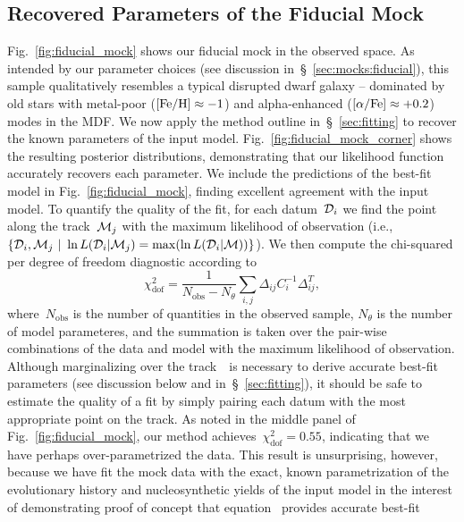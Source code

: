 \documentclass[ms.tex]{subfiles}
\begin{document}
\subsection{Recovered Parameters of the Fiducial Mock}
\label{sec:mocks:recovered}

Fig.~\ref{fig:fiducial_mock} shows our fiducial mock in the observed space.
As intended by our parameter choices (see discussion
in~\S~\ref{sec:mocks:fiducial}), this sample qualitatively resembles a typical
disrupted dwarf galaxy -- dominated by old stars with metal-poor
($\text{[Fe/H]} \approx -1$) and alpha-enhanced ($\text{[$\alpha$/Fe]} \approx +0.2$) modes in the MDF.
We now apply the method outline in~\S~\ref{sec:fitting} to recover the known
parameters of the input model.
Fig.~\ref{fig:fiducial_mock_corner} shows the resulting posterior distributions,
demonstrating that our likelihood function accurately recovers each parameter.
We include the predictions of the best-fit model in Fig.~\ref{fig:fiducial_mock},
finding excellent agreement with the input model.
To quantify the quality of the fit, for each datum~$\mathcal{D}_i$ we find the
point along the track~$\mathcal{M}_j$ with the maximum likelihood of observation
(i.e.,~$\{\mathcal{D}_i,\mathcal{M}_j~|~\ln L(\mathcal{D}_i | \mathcal{M}_j) =
\max(\ln L(\mathcal{D}_i | \mathcal{M}))\}$).
We then compute the chi-squared per degree of freedom diagnostic according to
\begin{equation}
\chi_\text{dof}^2 = \frac{1}{N_\text{obs} - N_\theta}
\sum_{i,j} \Delta_{ij} C_i^{-1} \Delta_{ij}^T,
\label{eq:chisquared_dof}
\end{equation}
where~$N_\text{obs}$ is the number of quantities in the observed sample,
$N_\theta$ is the number of model parameteres, and the summation is taken over
the pair-wise combinations of the data and model with the maximum likelihood of
observation.
Although marginalizing over the track~~is necessary to derive
accurate best-fit parameters (see discussion below and in~\S~\ref{sec:fitting}),
it should be safe to estimate the quality of a fit by simply pairing each datum
with the most appropriate point on the track.
As noted in the middle panel of Fig.~\ref{fig:fiducial_mock}, our method
achieves~$\chi_\text{dof}^2 = 0.55$, indicating that we have perhaps
over-parametrized the data.
This result is unsurprising, however, because we have fit the mock data with
the exact, known parametrization of the evolutionary history and
nucleosynthetic yields of the input model in the interest of demonstrating
proof of concept that equation~ provides accurate best-fit
\end{document}
